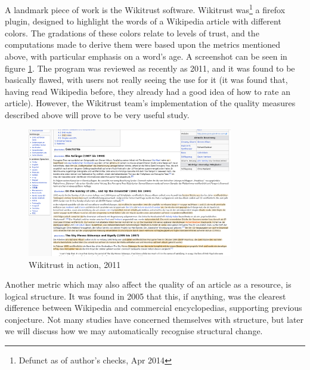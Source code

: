 \documentclass[a4paper,11pt,twoside,notitlepage]{article}
\begin{document}
        A landmark piece of work is the Wikitrust
        software.\cite{Adler2007} Wikitrust was\footnote{Defunct as of
          author's checks, Apr 2014} a firefox plugin, designed to
        highlight the words of a Wikipedia article with different
        colors. The gradations of these colors relate to levels of
        trust, and the computations made to derive them were based
        upon the metrics mentioned above, with particular emphasis on
        a word's age. A screenshot can be seen in figure
        \ref{fig:wikitrust}. The program was reviewed as recently as
        2011,\cite{Lucassen2011} and it was found to be basically flawed,
        with users not really seeing the use for it (it was found
        that, having read Wikipedia before, they already had a good
        idea of how to rate an article). However, the Wikitrust team's
        implementation of the quality measures described above will
        prove to be very useful study.
        
       \begin{figure}
         \centering
         \includegraphics[width=0.8\textwidth,clip=true,resolution=300]{img/wikitrust.png}
         \caption{Wikitrust in action, 2011}
         \label{fig:wikitrust}
       \end{figure}

        Another metric which may also affect the quality of an article as
        a resource, is logical structure. It was found in 2005 that
        this, if anything, was the clearest difference between
        Wikipedia and commercial encyclopedias,\cite{Giles2005}
        supporting previous conjecture.\cite{Denning2005} Not many
        studies have concerned themselves with structure, but later we
        will discuss how we may automatically recognise structural
        change.
        
\end{document}
